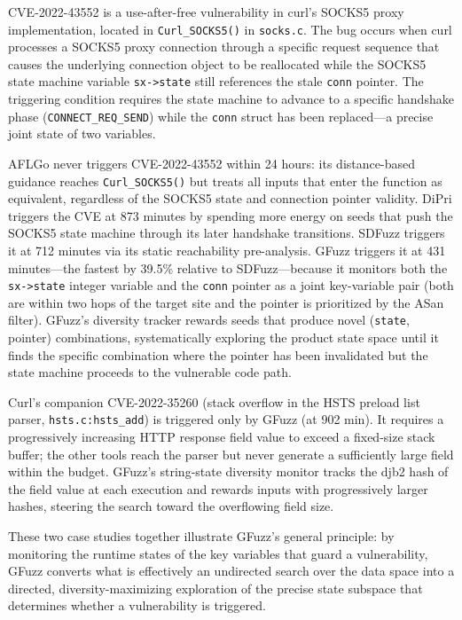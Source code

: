 \documentclass[preprint,12pt,3p]{elsarticle}
\begin{document}
CVE-2022-43552 is a use-after-free vulnerability in curl's SOCKS5 proxy
implementation, located in \texttt{Curl\_SOCKS5()} in \texttt{socks.c}.
The bug occurs when curl processes a SOCKS5 proxy connection through a
specific request sequence that causes the underlying connection object to
be reallocated while the SOCKS5 state machine variable \texttt{sx->state}
still references the stale \texttt{conn} pointer.  The triggering condition
requires the state machine to advance to a specific handshake phase
(\texttt{CONNECT\_REQ\_SEND}) while the \texttt{conn} struct has been
replaced---a precise joint state of two variables.

AFLGo never triggers CVE-2022-43552 within 24 hours: its distance-based
guidance reaches \texttt{Curl\_SOCKS5()} but treats all inputs that enter
the function as equivalent, regardless of the SOCKS5 state and connection
pointer validity.  DiPri triggers the CVE at 873 minutes by spending more
energy on seeds that push the SOCKS5 state machine through its later
handshake transitions.  SDFuzz triggers it at 712 minutes via its static
reachability pre-analysis.  GFuzz triggers it at 431 minutes---the fastest
by 39.5\% relative to SDFuzz---because it monitors both the \texttt{sx->state}
integer variable and the \texttt{conn} pointer as a joint key-variable pair
(both are within two hops of the target site and the pointer is prioritized by
the ASan filter).  GFuzz's diversity tracker rewards seeds that produce novel
(\texttt{state}, pointer) combinations, systematically exploring the product
state space until it finds the specific combination where the pointer has been
invalidated but the state machine proceeds to the vulnerable code path.

Curl's companion CVE-2022-35260 (stack overflow in the HSTS preload list
parser, \texttt{hsts.c:hsts\_add}) is triggered only by GFuzz (at 902 min).
It requires a progressively increasing HTTP response field value to exceed a
fixed-size stack buffer; the other tools reach the parser but never generate
a sufficiently large field within the budget.  GFuzz's string-state diversity
monitor tracks the djb2 hash of the field value at each execution and rewards
inputs with progressively larger hashes, steering the search toward the
overflowing field size.

These two case studies together illustrate GFuzz's general principle: by
monitoring the runtime states of the key variables that guard a vulnerability,
GFuzz converts what is effectively an undirected search over the data space
into a directed, diversity-maximizing exploration of the precise state
subspace that determines whether a vulnerability is triggered.
\end{document}
